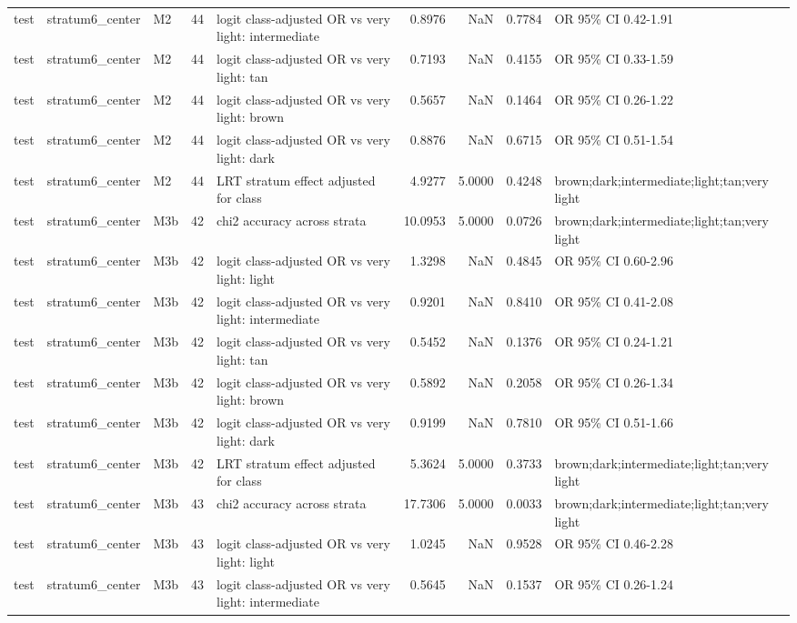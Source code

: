 \begin{tabular}{lllrlrrrl}
test & stratum6\_center & M2 & 44 & logit class-adjusted OR vs very light: intermediate & 0.8976 & NaN & 0.7784 & OR 95\% CI 0.42-1.91 \\
test & stratum6\_center & M2 & 44 & logit class-adjusted OR vs very light: tan & 0.7193 & NaN & 0.4155 & OR 95\% CI 0.33-1.59 \\
test & stratum6\_center & M2 & 44 & logit class-adjusted OR vs very light: brown & 0.5657 & NaN & 0.1464 & OR 95\% CI 0.26-1.22 \\
test & stratum6\_center & M2 & 44 & logit class-adjusted OR vs very light: dark & 0.8876 & NaN & 0.6715 & OR 95\% CI 0.51-1.54 \\
test & stratum6\_center & M2 & 44 & LRT stratum effect adjusted for class & 4.9277 & 5.0000 & 0.4248 & brown;dark;intermediate;light;tan;very light \\
test & stratum6\_center & M3b & 42 & chi2 accuracy across strata & 10.0953 & 5.0000 & 0.0726 & brown;dark;intermediate;light;tan;very light \\
test & stratum6\_center & M3b & 42 & logit class-adjusted OR vs very light: light & 1.3298 & NaN & 0.4845 & OR 95\% CI 0.60-2.96 \\
test & stratum6\_center & M3b & 42 & logit class-adjusted OR vs very light: intermediate & 0.9201 & NaN & 0.8410 & OR 95\% CI 0.41-2.08 \\
test & stratum6\_center & M3b & 42 & logit class-adjusted OR vs very light: tan & 0.5452 & NaN & 0.1376 & OR 95\% CI 0.24-1.21 \\
test & stratum6\_center & M3b & 42 & logit class-adjusted OR vs very light: brown & 0.5892 & NaN & 0.2058 & OR 95\% CI 0.26-1.34 \\
test & stratum6\_center & M3b & 42 & logit class-adjusted OR vs very light: dark & 0.9199 & NaN & 0.7810 & OR 95\% CI 0.51-1.66 \\
test & stratum6\_center & M3b & 42 & LRT stratum effect adjusted for class & 5.3624 & 5.0000 & 0.3733 & brown;dark;intermediate;light;tan;very light \\
test & stratum6\_center & M3b & 43 & chi2 accuracy across strata & 17.7306 & 5.0000 & 0.0033 & brown;dark;intermediate;light;tan;very light \\
test & stratum6\_center & M3b & 43 & logit class-adjusted OR vs very light: light & 1.0245 & NaN & 0.9528 & OR 95\% CI 0.46-2.28 \\
test & stratum6\_center & M3b & 43 & logit class-adjusted OR vs very light: intermediate & 0.5645 & NaN & 0.1537 & OR 95\% CI 0.26-1.24 \\

\end{tabular}
